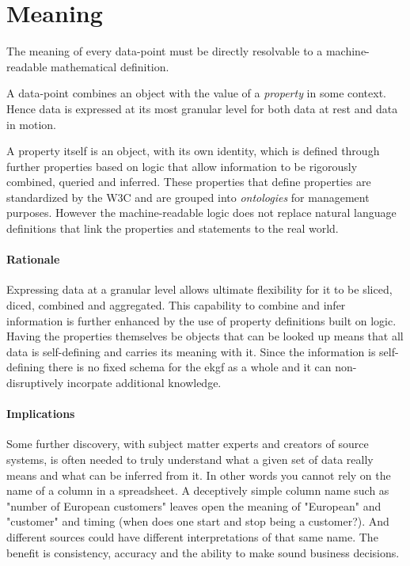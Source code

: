 \section{Meaning}\label{sec:ekg-principle-meaning}

The meaning of every \gls{data-point} must be directly resolvable 
to a machine-readable mathematical definition.

A \gls{data-point} combines an object with the value of a \textit{property} in some context. 
Hence data is expressed at its most granular level for both data at rest and data in motion.

A \gls{property} itself is an object, with its own identity, which is defined through further properties 
based on logic that allow information to be rigorously combined, queried and inferred. 
These properties that define properties are standardized by the W3C and are grouped 
into \textit{ontologies} for management purposes.
However the machine-readable logic does not replace natural language definitions that 
link the properties and statements to the real world.

\paragraph{Rationale} Expressing data at a granular level allows ultimate flexibility 
for it to be sliced, diced, combined and aggregated. This capability to combine and 
infer information is further enhanced by the use of \gls{property} definitions built on logic.
Having the properties themselves be objects that can be looked up means that all data 
is self-defining and carries its meaning with it.
Since the information is self-defining there is no fixed schema for the \gls{ekgf} 
as a whole and it can non-disruptively incorpate additional knowledge.

\paragraph{Implications} Some further discovery, with subject matter experts and 
creators of source systems, is often needed to truly understand what a given 
set of data really means and what can be inferred from it. 
In other words you cannot rely on the name of a column in a spreadsheet. 
A deceptively simple column name such as "number of European customers" leaves 
open the meaning of "European" and "customer" and timing (when does one start 
and stop being a customer?). And different sources could have different 
interpretations of that same name.
The benefit is consistency, accuracy and the ability to make sound business decisions.

